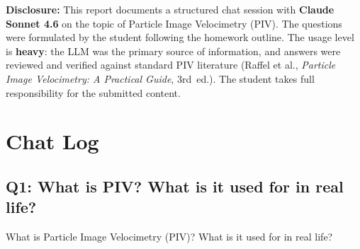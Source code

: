 \documentclass[12pt,a4paper]{article}
\begin{document}
\begin{tcolorbox}[
    enhanced,
    colback=lightblue!20!white,
    colframe=accentblue,
    boxrule=0.8pt,
    arc=4pt,
    left=12pt, right=12pt, top=10pt, bottom=10pt
]
\;\textbf{Disclosure:} This report documents a structured chat session with \textbf{\color{accentblue}Claude Sonnet 4.6} on the topic of Particle Image Velocimetry (PIV). The questions were formulated by the student following the homework outline. The usage level is \textbf{\color{accentred}heavy}: the LLM was the primary source of information, and answers were reviewed and verified against standard PIV literature (Raffel et al., \textit{Particle Image Velocimetry: A Practical Guide}, 3rd~ed.). The student takes full responsibility for the submitted content.
\end{tcolorbox}

\section{Chat Log}

\subsection{Q1: What is PIV? What is it used for in real life?}

\begin{questionbox}
What is Particle Image Velocimetry (PIV)? What is it used for in real life?
\end{questionbox}
\end{document}
